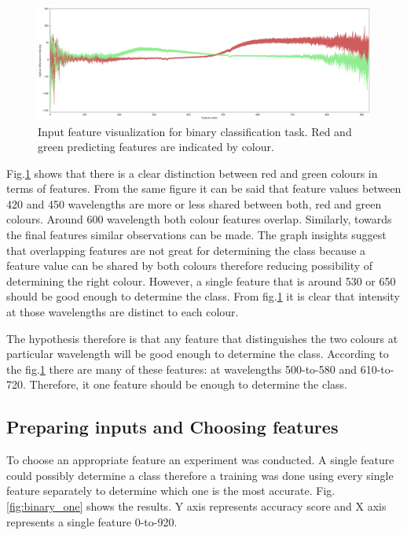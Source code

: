 \documentclass[11pt]{article}
\begin{document}
		\begin{figure}[H]
			\includegraphics[width=1\textwidth]{png/binary_default}
			\caption{Input feature visualization for binary classification task. Red and green predicting features are indicated by colour.}
			\label{fig:binary}
		\end{figure}

		Fig.\ref{fig:binary} shows that there is a clear distinction between red and green colours in terms of features. From the same figure it can be said that feature values between 420 and 450 wavelengths are more or less shared between both, red and green colours. Around 600 wavelength both colour features overlap. Similarly, towards the final features similar observations can be made. The graph insights suggest that overlapping features are not great for determining the class because a feature value can be shared by both colours therefore reducing possibility of determining the right colour. However, a single feature that is around 530 or 650 should be good enough to determine the class. From fig.\ref{fig:binary} it is clear that intensity at those wavelengths are distinct to each colour.

		The hypothesis therefore is that any feature that distinguishes the two colours at particular wavelength will be good enough to determine the class. According to the fig.\ref{fig:binary} there are many of these features: at wavelengths 500-to-580 and 610-to-720. Therefore, it one feature should be enough to determine the class.

	\subsection{Preparing inputs and Choosing features}

		To choose an appropriate feature an experiment was conducted. A single feature could possibly determine a class therefore a training was done using every single feature separately to determine which one is the most accurate. Fig.\ref{fig:binary_one} shows the results. Y axis represents accuracy score and X axis represents a single feature 0-to-920. 
\end{document}
